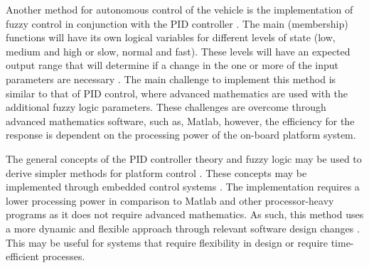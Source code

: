 \documentclass[main.tex]{subfiles}
\begin{document}
Another method for autonomous control of the vehicle is the implementation of fuzzy control in conjunction with the PID controller \parencite{zhang2009fuzzy}. The main (membership) functions will have its own logical variables for different levels of state (low, medium and high or slow, normal and fast)\parencite{johnson2005pid}. These levels will have an expected output range that will determine if a change in the one or more of the input parameters are necessary \parencite{johnson2005pid}. The main challenge to implement this method is similar to that of PID control, where advanced mathematics are used with the additional fuzzy logic parameters. These challenges are overcome through advanced mathematics software, such as, Matlab, however, the efficiency for the response is dependent on the processing power of the on-board platform system. 

The general concepts of the PID controller theory and fuzzy logic may be used to derive simpler methods for platform control \parencite{Ledin2003}. These concepts may be implemented through embedded control systems \parencite{Ledin2003}. The implementation requires a lower processing power in comparison to Matlab and other processor-heavy programs as it does not require advanced mathematics. As such, this method uses a more dynamic and flexible approach through relevant software design changes \parencite{Ledin2003}. This may be useful for systems that require flexibility in design or require time-efficient processes. 

\end{document}
